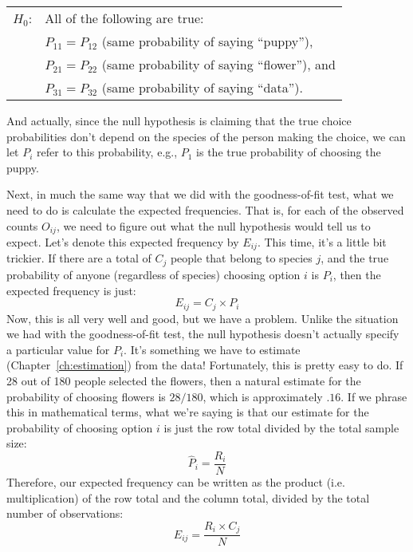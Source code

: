 \smallskip
\begin{tabular}{ll}
$H_0$: \hspace*{0.5cm} & All of the following are true: \\ 
    & $P_{11} = P_{12}$ (same probability of saying ``puppy''), \\ 
	& $P_{21} = P_{22}$ (same probability of saying ``flower''), and\\ 
	& $P_{31} = P_{32}$ (same probability of saying ``data'').\\ 
\end{tabular} 
\smallskip

\noindent
And actually, since the null hypothesis is claiming that the true choice probabilities don't depend on the species of the person making the choice, we can let $P_i$ refer to this probability, e.g., $P_1$ is the true probability of choosing the puppy.

Next, in much the same way that we did with the goodness-of-fit test, what we need to do is calculate the expected frequencies. That is, for each of the observed counts $O_{ij}$, we need to figure out what the null hypothesis would tell us to expect. Let's denote this expected frequency by $E_{ij}$. This time, it's a little bit trickier. If there are a total of $C_j$ people that belong to species $j$, and the true probability of anyone (regardless of species) choosing option $i$ is $P_i$, then the expected frequency is just: 
$$
E_{ij} = C_j \times P_i
$$
Now, this is all very well and good, but we have a problem. Unlike the situation we had with the goodness-of-fit test, the null hypothesis doesn't actually specify a particular value for $P_i$. It's something we have to estimate (Chapter~\ref{ch:estimation}) from the data! Fortunately, this is pretty easy to do. If 28 out of 180 people selected the flowers, then a natural estimate for the probability of choosing flowers is $28/180$, which is approximately $.16$. If we phrase this in mathematical terms, what we're saying is that our estimate for the probability of choosing option $i$ is just the row total divided by the total sample size:
$$
\hat{P}_i = \frac{R_i}{N}
$$
Therefore, our expected frequency can be written as the product (i.e. multiplication) of the row total and the column total, divided by the total number of observations:
$$
E_{ij} = \frac{R_i \times C_j}{N}
$$

